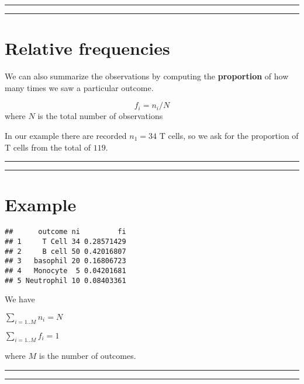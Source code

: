 \documentclass[
]{book}
\begin{document}
\begin{center}\rule{0.5\linewidth}{0.5pt}\end{center}

\begin{center}\rule{0.5\linewidth}{0.5pt}\end{center}

\hypertarget{relative-frequencies}{%
\section{Relative frequencies}\label{relative-frequencies}}

We can also summarize the observations by computing the \textbf{proportion} of how many times we saw a particular outcome.

\[f_i=n_i/N\] where \(N\) is the total number of observations

In our example there are recorded \(n_1=34\) T cells, so we ask for the proportion of T cells from the total of \(119\).

\begin{center}\rule{0.5\linewidth}{0.5pt}\end{center}

\begin{center}\rule{0.5\linewidth}{0.5pt}\end{center}

\hypertarget{example-1}{%
\section{Example}\label{example-1}}

\begin{verbatim}
##      outcome ni         fi
## 1     T Cell 34 0.28571429
## 2     B cell 50 0.42016807
## 3   basophil 20 0.16806723
## 4   Monocyte  5 0.04201681
## 5 Neutrophil 10 0.08403361
\end{verbatim}

We have

\(\sum_{i=1..M} n_i = N\)

\(\sum_{i=1..M} f_i = 1\)

where \(M\) is the number of outcomes.

\begin{center}\rule{0.5\linewidth}{0.5pt}\end{center}

\begin{center}\rule{0.5\linewidth}{0.5pt}\end{center}
\end{document}
